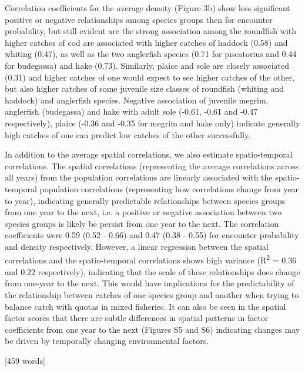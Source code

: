 \documentclass{nature}
\begin{document}
\begin{linenumbers}
Correlation coefficients for the average density (Figure 3b) show less
significant positive or negative relationships among species groups then for
encounter probability, but still evident are the strong association among the
roundfish with higher catches of cod are associated with higher catches of
haddock (0.58) and whiting (0.47), as well as the two anglerfish species (0.71
for piscatorius and 0.44 for budegassa) and hake (0.73). Similarly, plaice and
sole are closely associated (0.31) and higher catches of one would expect to
see higher catches of the other, but also higher catches of some juvenile size
classes of roundfish (whiting and haddock) and anglerfish species. Negative
association of juvenile megrim, anglerfish (budegassa) and hake with adult sole
(-0.61, -0.61 and -0.47 respectively), plaice (-0.36 and -0.35 for megrim and
hake only) indicate generally high catches of one can predict low catches of
the other successfully.

In addition to the average spatial correlations, we also estimate
spatio-temporal correlations.  The spatial correlations (representing the
average correlations across all years) from the population correlations are
linearly associated with the spatio-temporal population correlations
(representing how correlations change from year to year), indicating generally
predictable relationships between species groups from one year to the next,
i.e. a positive or negative association between two species groups is likely be
persist from one year to the next. The correlation coefficients were 0.59 (0.52
- 0.66) and 0.47 (0.38 - 0.55) for encounter probability and density
respectively.  However, a linear regression between the spatial correlations
and the spatio-temporal correlations shows high variance (R\textsuperscript{2}
= 0.36 and 0.22 respectively), indicating that the scale of these relationships
does change from one-year to the next. This would have implications for the
predictability of the relationship between catches of one species group and
another when trying to balance catch with quotas in mixed fisheries. It can
also be seen in the spatial factor scores that there are subtle differences in
spatial patterns in factor coefficients from one year to the next (Figures S5
and S6) indicating changes may be driven by temporally changing environmental
factors.

[459 words]



\end{linenumbers}
\end{document}

